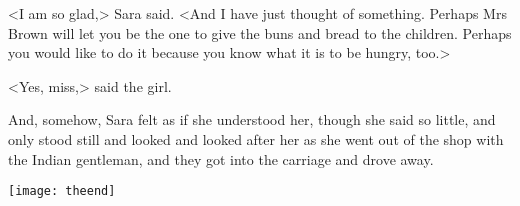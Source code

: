 <I am so glad,> Sara said. <And I have just thought of something. Perhaps Mrs Brown will let you be the one to give the buns and bread to the children. Perhaps you would like to do it because you know what it is to be hungry, too.>

<Yes, miss,> said the girl.

And, somehow, Sara felt as if she understood her, though she said so little, and only stood still and looked and looked after her as she went out of the shop with the Indian gentleman, and they got into the carriage and drove away.

\vfill
\begin{center}
\texttt{[image: theend]}
\end{center}